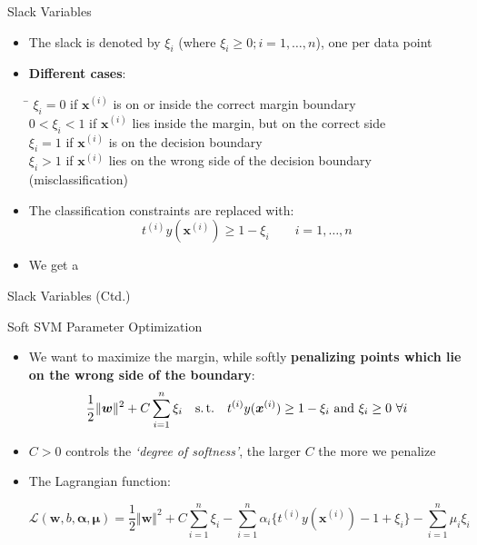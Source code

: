 \begin{frame}{Slack Variables}{}
	\begin{itemize}
		\item The slack is denoted by $\xi_i$ (where $\xi_i \ge 0; i = 1, \dots, n$), one per data point
		\item \textbf{Different cases}:
		
		\footnotesize
		\begin{tabbing}
			\hspace*{2.5cm}\= \kill
			$\xi_i = 0$ 		\> if $\bm{x}^{(i)}$ is on or inside the correct margin boundary 		\\
			$0 < \xi_i < 1$ 		\> if $\bm{x}^{(i)}$ lies inside the margin, but on the correct side 	\\
			$\xi_i = 1$ 		\> if $\bm{x}^{(i)}$ is on the decision boundary 					\\
			$\xi_i > 1$ 		\> if $\bm{x}^{(i)}$ lies on the wrong side of the decision boundary (misclassification)
		\end{tabbing}
		\normalsize

		\item The classification constraints are replaced with:
		\begin{equation}
			t^{(i)} y(\bm{x}^{(i)}) \ge 1 - \xi_i \qquad i = 1, \dots, n
		\end{equation}
		\item We get a 
	\end{itemize}
\end{frame}


\begin{frame}{Slack Variables (Ctd.)}{}
	
\end{frame}


\begin{frame}{Soft SVM Parameter Optimization}{}
	\begin{itemize}
		\item We want to maximize the margin, while softly \textbf{penalizing points which lie on the wrong side of the boundary}:
		\begin{equation}
			\frac{1}{2} \Vert \bm{w} \Vert^2 + C \sum_{i=1}^n \xi_i
			\quad \text{s.\,t.} \quad t^{(i)} y(\bm{x}^{(i)}) \ge 1 - \xi_i\ \text{and}\ \xi_i \ge 0\ \forall i
		\end{equation}
		\item $C > 0$ controls the \textit{`degree of softness'}, the larger $C$ the more we penalize
		\item The Lagrangian function:
		
		\footnotesize
		\vspace*{-2mm}
		\begin{equation}
			\mathcal{L}(\bm{w}, b, \bm{\alpha}, \bm{\mu})
				= \frac{1}{2} \Vert \bm{w} \Vert^2 + C \sum_{i=1}^n \xi_i -
					\sum_{i=1}^n \alpha_i \{ t^{(i)} y(\bm{x}^{(i)}) - 1 + \xi_i \} - \sum_{i=1}^n \mu_i \xi_i
		\end{equation}
	\end{itemize}
\end{frame}


